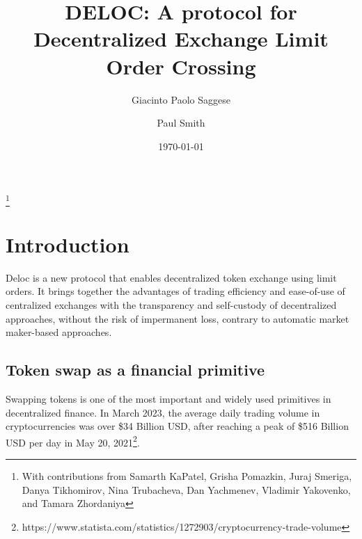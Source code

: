 \documentclass[11pt, reqno]{amsart}
\theoremstyle{definition}
\theoremstyle{remark}
\begin{document}
\title{DELOC: A protocol for Decentralized Exchange Limit Order Crossing}

\author{Giacinto Paolo Saggese}
\author{Paul Smith}

\thanks{With contributions from
	Samarth KaPatel,
	Grisha Pomazkin,
	Juraj Smeriga,
	Danya Tikhomirov,
	Nina Trubacheva,
	Dan Yachmenev,
	Vladimir Yakovenko,
	and
	Tamara Zhordaniya}

\date{\today}

\maketitle

\tableofcontents


\section{Introduction}


Deloc is a new protocol that enables decentralized token exchange using limit
orders. It brings together the advantages of trading efficiency and ease-of-use
of centralized exchanges with the transparency and self-custody of
decentralized approaches, without the risk of impermanent loss, contrary to
automatic market maker-based approaches.

\subsection{Token swap as a financial primitive}
Swapping tokens is one of the most important and widely used primitives in
decentralized finance.
In March 2023, the average daily trading volume in cryptocurrencies was over
\$34 Billion USD, after reaching a peak of \$516 Billion USD per day in May 20,
2021\footnote{https://www.statista.com/statistics/1272903/cryptocurrency-trade-volume}.

\end{document}
